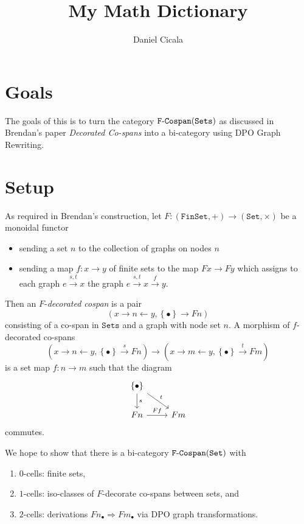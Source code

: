 \documentclass[10pt,a4paper]{article}
\author{Daniel Cicala}
\title{My Math Dictionary}
\newcommand{\cat}[1]{\mathtt{#1}}
\newcommand{\define}[1]{\emph{#1}}
\renewcommand{\t}[1]{\textup{#1}}
\newcommand{\from}{\colon}
\newcommand{\xto}[1]{\xrightarrow{#1}}
\newcommand{\unto}{\leftarrow}
\renewcommand{\(}{\left(}
\renewcommand{\)}{\right)}
\renewcommand{\{}{\left\lbrace}
\renewcommand{\}}{\right\rbrace}
\theoremstyle{remark}
\theoremstyle{definition}
\begin{document}
\section*{Goals}

The goals of this is to turn the category $\cat{F\t{-}Cospan(Sets)}$ as discussed in Brendan's paper \textit{Decorated Co-spans} into a bi-category using DPO Graph Rewriting.

\section*{Setup}

As required in Brendan's construction, let $F \from (\cat{FinSet},+) \to (\cat{Set},\times)$ be a monoidal functor 
\begin{itemize}
	\item sending a set $n$ to the collection of graphs on nodes $n$
	\item sending a map $f \from x \to y$ of finite sets to the map $Fx \to Fy$ which assigns to each graph $e \xto{s,t} x$ the graph $e \xto{s,t} x \xto{f} y$.
\end{itemize}
Then an $F$-\define{decorated cospan} is a pair 
\[
	\( x \to n \unto y , \{\bullet\} \to Fn \)
\]
consisting of a co-span in $\cat{Sets}$ and a graph with node set $n$. A morphism of $f$-decorated co-spans 
\[
	(x \to n \unto y , \{\bullet\} \xto{s} Fn) \to (x \to m \unto y , \{\bullet\} \xto{t} Fm)
\]
is a set map $f \from n \to m$ such that the diagram
\[
	\begin{tikzcd}
		\{ \bullet \} \arrow[]{d}{s} \arrow[]{dr}{t} &
		{} \\
		Fn \arrow[]{r}{Ff}&
		Fm
	\end{tikzcd}
\]
commutes.

We hope to show that there is a bi-category $\cat{F\t{-}Cospan(Set)}$ with
\begin{enumerate}
	\item $0$-cells: finite sets,
	\item $1$-cells: iso-classes of $F$-decorate co-spans between sets, and
	\item $2$-cells: derivations $Fn_{\bullet} \Rightarrow Fm_{\bullet}$ via DPO graph transformations.
\end{enumerate}
\end{document}

